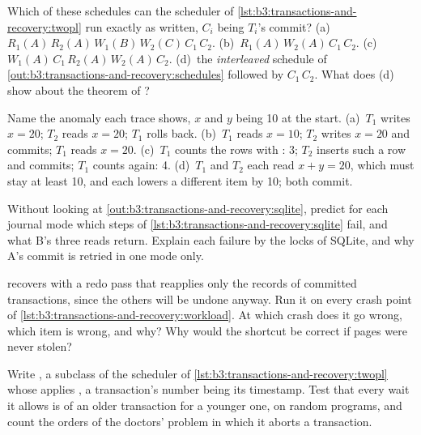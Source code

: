 \begin{exercise}[$\star$]\label{exo:b3:transactions-and-recovery:2}
Which of these schedules can the  scheduler of \cref{lst:b3:transactions-and-recovery:twopl} run exactly as written, $C_i$ being $T_i$'s commit? (a)~$R_1(A)\,R_2(A)\,W_1(B)\,W_2(C)\,C_1\,C_2$. (b)~$R_1(A)\,W_2(A)\,C_1\,C_2$. (c)~$W_1(A)\,C_1\,R_2(A)\,W_2(A)\,C_2$. (d)~the \emph{interleaved} schedule of \cref{out:b3:transactions-and-recovery:schedules} followed by $C_1\,C_2$. What does (d) show about the theorem of ?
\end{exercise}

\begin{exercise}[$\star$]\label{exo:b3:transactions-and-recovery:3}
Name the anomaly each trace shows, $x$ and $y$ being 10 at the start. (a)~$T_1$ writes $x = 20$; $T_2$ reads $x = 20$; $T_1$ rolls back. (b)~$T_1$ reads $x = 10$; $T_2$ writes $x = 20$ and commits; $T_1$ reads $x = 20$. (c)~$T_1$ counts the rows with : 3; $T_2$ inserts such a row and commits; $T_1$ counts again: 4. (d)~$T_1$ and $T_2$ each read $x + y = 20$, which must stay at least 10, and each lowers a different item by 10; both commit.
\end{exercise}

\begin{exercise}[$\star$]\label{exo:b3:transactions-and-recovery:4}
Without looking at \cref{out:b3:transactions-and-recovery:sqlite}, predict for each journal mode which steps of \cref{lst:b3:transactions-and-recovery:sqlite} fail, and what B's three reads return. Explain each failure by the locks of SQLite, and why A's commit is retried in one mode only.
\end{exercise}

\begin{exercise}[$\star\star$]\label{exo:b3:transactions-and-recovery:5}
 recovers with a redo pass that reapplies only the records of committed transactions, since the others will be undone anyway. Run it on every crash point of \cref{lst:b3:transactions-and-recovery:workload}. At which crash does it go wrong, which item is wrong, and why? Why would the shortcut be correct if pages were never stolen?
\end{exercise}

\begin{exercise}[$\star\star$]\label{exo:b3:transactions-and-recovery:6}
Write , a subclass of the scheduler of \cref{lst:b3:transactions-and-recovery:twopl} whose  applies , a transaction's number being its timestamp. Test that every wait it allows is of an older transaction for a younger one, on random programs, and count the orders of the doctors' problem in which it aborts a transaction.
\end{exercise}

